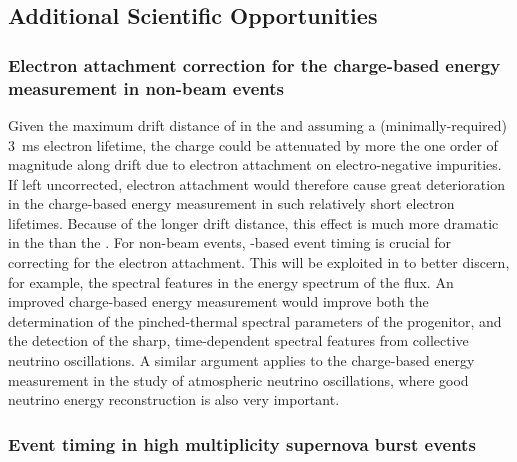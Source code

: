 
\subsection{Additional Scientific Opportunities}
\label{subsec:dp-pds-requirements_opportunities}

\subsubsection{Electron attachment correction for the charge-based energy measurement in non-beam events}
\label{subsubsec:dp-pds-requirements_attachment}

Given the maximum drift distance of \dpmaxdrift in the \dual {} and assuming a (minimally-required) \SI{3}{\ms} electron lifetime, the charge could be attenuated by more the one order of magnitude along drift due to electron attachment on electro-negative impurities. If left uncorrected, electron attachment would therefore cause great deterioration in the charge-based energy measurement in such relatively short electron lifetimes. Because of the longer drift distance, this effect is much more dramatic in the  than the . For non-beam events, -based event timing is crucial for correcting for the electron attachment.
This will be exploited in \dune to better discern, for example, the spectral features in the energy spectrum of the  flux. An improved charge-based energy measurement would improve both the determination of the pinched-thermal spectral parameters of the progenitor, and the detection of the sharp, time-dependent spectral features from collective neutrino oscillations. A similar argument applies to the charge-based energy measurement in the study of atmospheric neutrino oscillations, where good neutrino energy reconstruction is also very important.

\subsubsection{Event timing in high multiplicity supernova burst events}

